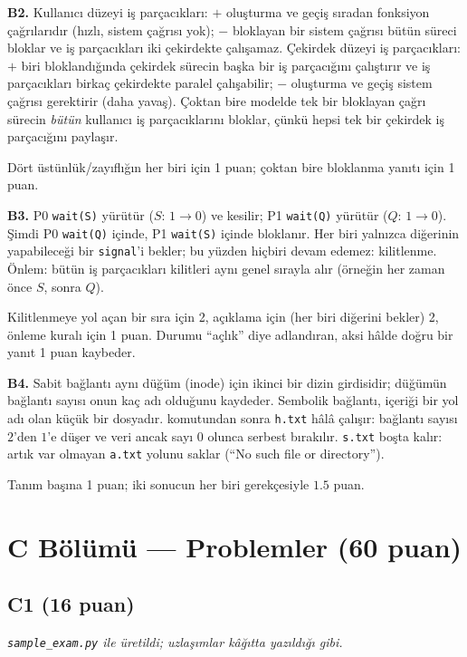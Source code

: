 \textbf{B2.} Kullanıcı düzeyi iş parçacıkları: $+$ oluşturma ve geçiş sıradan fonksiyon çağrılarıdır (hızlı, sistem çağrısı yok); $-$ bloklayan bir sistem çağrısı bütün süreci bloklar ve iş parçacıkları iki çekirdekte çalışamaz. Çekirdek düzeyi iş parçacıkları: $+$ biri bloklandığında çekirdek sürecin başka bir iş parçacığını çalıştırır ve iş parçacıkları birkaç çekirdekte paralel çalışabilir; $-$ oluşturma ve geçiş sistem çağrısı gerektirir (daha yavaş). Çoktan bire modelde tek bir bloklayan çağrı sürecin \emph{bütün} kullanıcı iş parçacıklarını bloklar, çünkü hepsi tek bir çekirdek iş parçacığını paylaşır.
\begin{rubric}Dört üstünlük/zayıflığın her biri için 1 puan; çoktan bire bloklanma yanıtı için 1 puan.\end{rubric}

\textbf{B3.} P0 \texttt{wait(S)} yürütür ($S$: $1 \to 0$) ve kesilir; P1 \texttt{wait(Q)} yürütür ($Q$: $1 \to 0$). Şimdi P0 \texttt{wait(Q)} içinde, P1 \texttt{wait(S)} içinde bloklanır. Her biri yalnızca diğerinin yapabileceği bir \texttt{signal}'i bekler; bu yüzden hiçbiri devam edemez: kilitlenme. Önlem: bütün iş parçacıkları kilitleri aynı genel sırayla alır (örneğin her zaman önce $S$, sonra $Q$).
\begin{rubric}Kilitlenmeye yol açan bir sıra için 2, açıklama için (her biri diğerini bekler) 2, önleme kuralı için 1 puan. Durumu ``açlık'' diye adlandıran, aksi hâlde doğru bir yanıt 1 puan kaybeder.\end{rubric}

\textbf{B4.} Sabit bağlantı aynı düğüm (inode) için ikinci bir dizin girdisidir; düğümün bağlantı sayısı onun kaç adı olduğunu kaydeder. Sembolik bağlantı, içeriği bir yol adı olan küçük bir dosyadır.  komutundan sonra \texttt{h.txt} hâlâ çalışır: bağlantı sayısı $2$'den $1$'e düşer ve veri ancak sayı $0$ olunca serbest bırakılır. \texttt{s.txt} boşta kalır: artık var olmayan \texttt{a.txt} yolunu saklar (``No such file or directory'').
\begin{rubric}Tanım başına 1 puan; iki sonucun her biri gerekçesiyle $1.5$ puan.\end{rubric}

\section*{C Bölümü --- Problemler (60 puan)}
\subsection*{C1 (16 puan)}
\textit{\texttt{sample\_exam.py} ile üretildi; uzlaşımlar kâğıtta yazıldığı gibi.}

